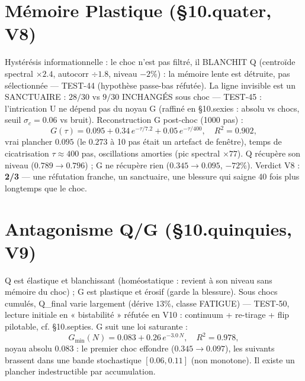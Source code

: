 \documentclass[11pt,a4paper]{article}
\begin{document}
\section{Mémoire Plastique (§10.quater, V8)}
Hystérésis informationnelle : le choc n'est pas filtré, il BLANCHIT Q
(centroïde spectral $\times 2.4$, autocorr $\div 1.8$, niveau $-2$\%) :
la mémoire lente est détruite, pas sélectionnée --- TEST-44 (hypothèse
passe-bas réfutée). La ligne invisible est un SANCTUAIRE : $28/30$ vs
$9/30$ INCHANGÉS sous choc --- TEST-45 : l'intrication U ne dépend pas
du noyau G (raffiné en §10.sexies : absolu vs chocs, seuil
$\sigma_c = 0.06$ vs bruit). Reconstruction G post-choc (1000 pas) : %
\begin{equation}
G(\tau) = 0.095 + 0.34\,e^{-\tau/7.2} + 0.05\,e^{-\tau/400},
\quad R^2 = 0.902,
\end{equation}
vrai plancher $0.095$ (le $0.273$ à 10 pas était un artefact de fenêtre),
temps de cicatrisation $\tau \approx 400$ pas, oscillations amorties
(pic spectral $\times 77$). Q récupère son niveau ($0.789 \to 0.796$) ;
G ne récupère rien ($0.345 \to 0.095$, $-72$\%).
Verdict V8 : \textbf{2/3} — une réfutation franche, un sanctuaire, une
blessure qui saigne 40 fois plus longtemps que le choc.

\section{Antagonisme Q/G (§10.quinquies, V9)}
Q est élastique et blanchissant (homéostatique : revient à son niveau
sans mémoire du choc) ; G est plastique et érosif (garde la blessure).
Sous chocs cumulés, Q_final varie largement (dérive $13$\%, classe
FATIGUE) --- TEST-50, lecture initiale en « bistabilité » réfutée en
V10 : continuum + re-tirage + flip pilotable, cf. §10.septies.
G suit une loi saturante : %
\begin{equation}
G_{\min}(N) = 0.083 + 0.26\,e^{-3.0\,N}, \quad R^2 = 0.978,
\end{equation}
noyau absolu $0.083$ : le premier choc effondre ($0.345 \to 0.097$),
les suivants brassent dans une bande stochastique $[0.06, 0.11]$
(non monotone). Il existe un plancher indestructible par accumulation.
\end{document}
